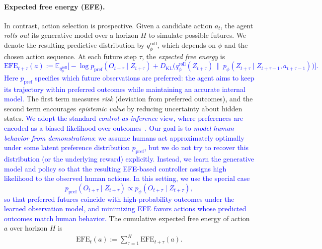 \documentclass{article} %
\newcommand{\revise}[1]{\textcolor{blue}{#1}}
\begin{document}
\paragraph{Expected free energy (EFE).}
In contrast, action selection is prospective.  
Given a candidate action $a_t$, the agent \emph{rolls out} its generative model over a horizon $H$ to simulate possible futures. 
We denote the resulting predictive distribution by $q_\phi^{\text{roll}}$, which depends on $\phi$ and the chosen action sequence.  
At each future step $\tau$, the \emph{expected free energy} is
\revise{{\small
$$
\text{EFE}_{t+\tau}(a) :=
\mathbb{E}_{q_\phi^{\text{roll}}} \Big[
  -\log p_{\text{pref}}(O_{t+\tau}\mid Z_{t+\tau})
  + D_{\mathrm{KL}}\!\big(q_\phi^{\text{roll}}(Z_{t+\tau}) \,\|\, p_\phi(Z_{t+\tau}\mid Z_{t+\tau-1},a_{t+\tau-1})\big)
\Big].
$$}
Here $p_{\text{pref}}$ specifies which future observations are preferred: the agent aims to keep its trajectory within preferred outcomes while maintaining an accurate internal model.} The first term measures \emph{risk} (deviation from preferred outcomes), and the second term encourages \emph{epistemic value} by reducing uncertainty about hidden states. \revise{We adopt the standard \emph{control-as-inference} view, where preferences are encoded as a biased likelihood over outcomes~\citep{levine2018reinforcement, toussaint2009robot}. Our goal is to \emph{model human behavior from demonstrations}: we assume humans act approximately optimally under some latent preference distribution $p_{\text{pref}}$, but we do not try to recover this distribution (or the underlying reward) explicitly. Instead, we learn the generative model and policy so that the resulting EFE-based controller assigns high likelihood to the observed human actions. In this setting, we use the special case
{\small
$$
p_{\text{pref}}(O_{t+\tau}\mid Z_{t+\tau}) \propto p_\phi(O_{t+\tau}\mid Z_{t+\tau}),
$$}
so that preferred futures coincide with high-probability outcomes under the learned observation model, and minimizing EFE favors actions whose predicted outcomes match human behavior.
} The cumulative expected free energy of action $a$ over horizon $H$ is
{\small
\begin{align}
\text{EFE}_{t}(a) := \sum_{\tau=1}^H \text{EFE}_{t+\tau}(a).
\label{eq:EFE}
\end{align}}
\end{document}
